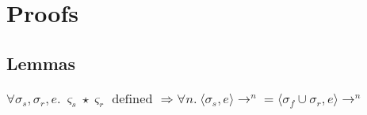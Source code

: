 \section{Proofs}

\subsection{Lemmas}

\subsubsection{$
    \forall \sigma_s, \sigma_r, e.\ \varsigma_s \star \varsigma_r \textrm{ defined }
    \Rightarrow \forall n.\ \langle \sigma_s, e \rangle \rightarrow^n =
    \langle \sigma_f \cup \sigma_r , e \rangle \rightarrow^n
$}\label{frame}

